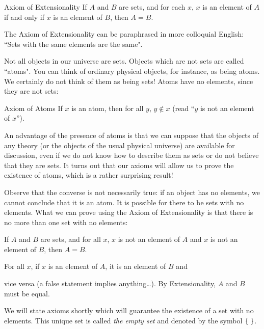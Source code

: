\begin{axiom}{Axiom of Extensionality}
 If $A$ and $B$ are sets, and for each $x$, $x$ is an
 element of $A$ if and only if $x$ is an element of $B$, then $A = B$.
\end{axiom}

The Axiom of Extensionality can be paraphrased in
more colloquial English:  ``Sets with the same elements are the same".

Not all objects in our universe are sets.  Objects which are
not sets are called ``atoms".  You can think of ordinary physical
objects, for instance, as being atoms.  We certainly do not think of
them as being sets!  Atoms have no elements, since they are not sets:

\begin{axiom}{Axiom of Atoms}
  If $x$ is an atom, then for all $y$, $y
  \not\in x$ (read ``$y$ is not an element of $x$'').
\end{axiom}

An advantage of the presence of atoms is that we can suppose
that the objects of any theory (or the objects of the usual physical
universe) are available for discussion, even if we do not know how to
describe them as sets or do not believe that they are sets.  It turns
out that our axioms will allow us to prove the existence of atoms,
which is a rather surprising result!

Observe that the converse is not necessarily true:  if an
object has no elements, we cannot conclude that it is an atom.  It is
possible for there to be sets with no elements.  What we can prove
using the Axiom of Extensionality is that there is no
more than one set with no elements:

\begin{thm}
 If $A$ and $B$ are sets, and for all $x$, $x$ is not
 an element of $A$ and $x$ is not an element of $B$, then $A = B$.
\end{thm}

\preuve  For all $x$, if $x$ is an element of $A$, it is an element of $B$
and\linebreak

\pagebreak

vice versa (a false statement implies anything\ldots).  By
Extensionality, $A$ and $B$ must be equal.
\finpreuve

We will state axioms shortly which will guarantee the
existence of a set with no elements.  This unique set is called {\itshape the
empty set\/} and denoted by the symbol $\mbox{$\{\;\}$}$.


